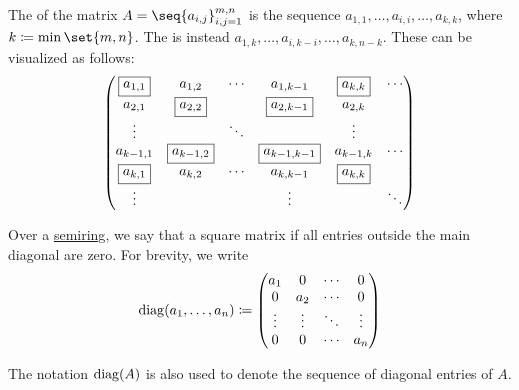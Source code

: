\begin{definition}\label{def:matrix_diagonal}
  The  of the matrix \( A = \seq{ a_{i,j} }_{i,j=1}^{m,n} \) is the sequence \( a_{1,1}, \ldots, a_{i,i}, \ldots, a_{k,k} \), where \( k \coloneqq \min\set{ m, n } \). The  is instead \( a_{1,k}, \ldots, a_{i,k-i}, \ldots, a_{k,n-k} \). These can be visualized as follows:
  \begin{equation*}
    \begin{pmatrix}
      \fbox{\( a_{1,1} \)} & a_{1,2}                & \cdots & a_{1,k-1}                & \fbox{\( a_{k,k} \)} & \cdots \\
      a_{2,1}              & \fbox{\( a_{2,2} \)}   &        & \fbox{\( a_{2,k-1} \)}   & a_{2,k}              &        \\
      \vdots               &                        & \ddots &                          & \vdots               &        \\
      a_{k-1,1}            & \fbox{\( a_{k-1,2} \)} &        & \fbox{\( a_{k-1,k-1} \)} & a_{k-1,k}            & \cdots \\
      \fbox{\( a_{k,1} \)} & a_{k,2}                & \cdots & a_{k,k-1}                & \fbox{\( a_{k,k} \)} &        \\
      \vdots               &                        &        & \vdots                   &                      & \ddots
    \end{pmatrix}
  \end{equation*}

  Over a \hyperref[def:semiring]{semiring}, we say that a square matrix  if all entries outside the main diagonal are zero. For brevity, we write
  \begin{equation*}
    \op{diag}(a_1, \ldots, a_n)
    \coloneqq
    \begin{pmatrix}
      a_1    & 0      & \cdots & 0      \\
      0      & a_2    & \cdots & 0      \\
      \vdots & \vdots & \ddots & \vdots \\
      0      & 0      & \cdots & a_n
    \end{pmatrix}
  \end{equation*}

  The notation \( \op{diag}(A) \) is also used to denote the sequence of diagonal entries of \( A \).
\end{definition}

